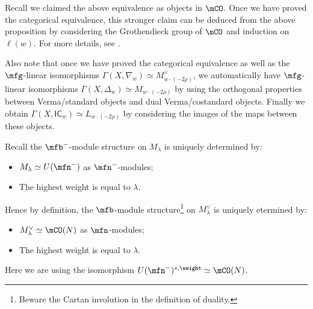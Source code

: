 	\begin{rem}
		 Recall we claimed the above equivalence as objects in $\mCO$. Once we have proved the categorical equivalence, this stronger claim can be deduced from the above proposition by considering the Grothendieck group of $\mCO$ and induction on $\ell(w)$. For more details, see \cite[Page 60]{G}. 

		 Also note that once we have proved the categorical equivalence as well as the $\mfg$-linear isomorphisms $\Gamma(X,\nabla_w) \simeq M_{w\cdot (-2\rho)}^\vee$, we automatically have $\mfg$-linear isomorphisms $\Gamma(X,\Delta_w) \simeq M_{w\cdot (-2\rho)}$ by using the orthogonal properties between Verma/standard objects and dual Verma/costandard objects. Finally we obtain $\Gamma(X,\mathsf{IC}_w) \simeq L_{w\cdot (-2\rho)}$ by considering the images of the maps between these objects.
	\end{rem}

	\proof[Sketch]
		Recall the $\mfb^-$-module structure on $M_\lambda$ is uniquely determined by:
		\begin{itemize}
			\item $M_\lambda\simeq U(\mfn^-)$ as $\mfn^-$-modules;
			\item The highest weight is equal to $\lambda$.
		\end{itemize}
		Hence by definition, the $\mfb$-module structure\footnote{Beware the Cartan involution in the definition of duality.} on $M_\lambda^\vee$ is uniquely etermined by:
		\begin{itemize}
			\item $M_\lambda^\vee\simeq \mCO(N)$ as $\mfn$-modules;
			\item The highest weight is equal to $\lambda$.
		\end{itemize}
		Here we are using the isomorphism $U(\mfn^-)^{*,\weight}\simeq \mCO(N)$. 

